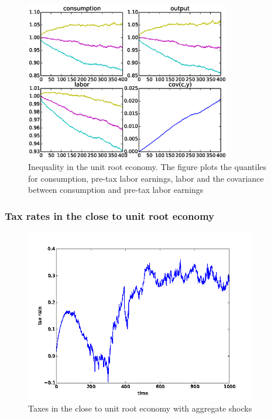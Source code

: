 \documentclass{beamer}
\begin{document}
\begin{frame}
  \begin{figure}[htp]
 \centering
 \includegraphics[width=0.8\textwidth]{Images/quant_pers.eps}
 \caption{Inequality in the unit root  economy. The figure plots the quantiles for consumption, pre-tax labor earnings, labor and the covariance between consumption and pre-tax labor earnings}
 \label{fig:quant_pers}
 \end{figure}
\end{frame}


\begin{frame}
\frametitle {Tax rates in the close to unit root economy}

  \begin{figure}[htp]
 \centering
 \includegraphics[width=0.9\textwidth]{Images/tax_plot.png}
 \caption{Taxes in the close to unit root economy with aggregate shocks }
 \label{fig:taxes_plots}
 \end{figure}
\end{frame}
\end{document}
